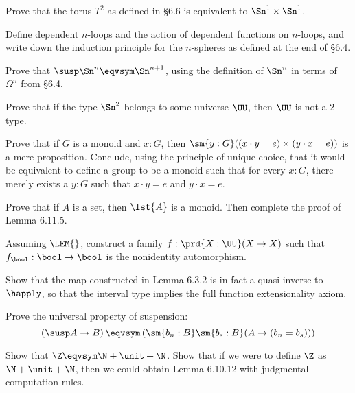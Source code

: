 Prove that the torus $T^{2}$ as defined in \S6.6 
is equivalent to $\Sn^{1} \times \Sn^{1}$.


Define dependent $n$-loops and the action of dependent functions on $n$-loops,
and write down the induction principle for the $n$-spheres as defined at the
end of \S6.4.


Prove that $\susp\Sn^{n} \eqvsym \Sn^{n+1}$, using the definition of $\Sn^{n}$
in terms of $\Omega^{n}$ from \S6.4.


Prove that if the type $\Sn^{2}$ belongs to some universe $\UU$, then $\UU$ is
not a 2-type.


Prove that if $G$ is a monoid and $x : G$, then $\sm{y:G}((x \cdot y = e)
\times (y \cdot x = e))$ is a mere proposition.  Conclude, using the principle
of unique choice, that it would be equivalent to define a group to be a monoid
such that for every $x : G$, there merely exists a $y : G$ such that $x \cdot y
= e$ and $y \cdot x = e$.


Prove that if $A$ is a set, then $\lst{A}$ is a monoid.  Then complete the
proof of Lemma 6.11.5.


Assuming $\LEM{}$, construct a family $f : \prd{X : \UU} (X \to X)$ such that
$f_{\bool} : \bool \to \bool$ is the nonidentity automorphism.


Show that the map constructed in Lemma 6.3.2 is in fact a quasi-inverse to
$\happly$, so that the interval type implies the full function extensionality
axiom.


Prove the universal property of suspension:
\[
  \left(\susp A \to B \right)
  \eqvsym
  \left(\sm{b_{n} : B}\sm{b_{s} : B} (A \to (b_{n} = b_{s}))\right)
\]


Show that $\Z \eqvsym \N + \unit + \N$.  Show that if we were to define $\Z$ as
$\N + \unit + \N$, then we could obtain Lemma 6.10.12 with judgmental
computation rules.
\begin{coqdoccode}
\end{coqdoccode}
